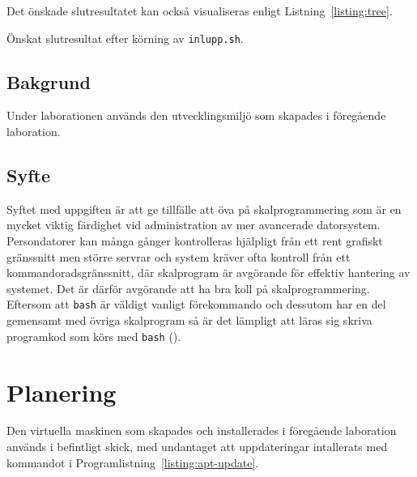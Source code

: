 Det önskade slutresultatet kan också visualiseras enligt Listning~\ref{listing:tree}.

\begin{listing}[H]
\caption{Önskat slutresultat efter körning av \texttt{inlupp.sh}.}
\label{listing:tree}
\end{listing}


\subsection{Bakgrund}
Under laborationen används den utvecklingsmiljö som skapades i föregående
laboration.


\subsection{Syfte}
Syftet med uppgiften är att ge tillfälle att öva på skalprogrammering som är en
mycket viktig färdighet vid administration av mer avancerade datorsystem.
Persondatorer kan många gånger kontrolleras hjälpligt från ett rent grafiskt
gränssnitt men större servrar och system kräver ofta kontroll från ett
kommandoradsgränssnitt, där skalprogram är avgörande för effektiv hantering av
systemet.  Det är därför avgörande att ha bra koll på skalprogrammering.
Eftersom att \texttt{bash} är väldigt vanligt förekommando och dessutom har en
del gemensamt med övriga skalprogram så är det lämpligt att läras sig skriva
programkod som körs med \texttt{bash} (\cite{forelasning02}).



\section{Planering}
Den virtuella maskinen som skapades och installerades i föregående laboration
används i befintligt skick, med undantaget att uppdateringar intallerats med
kommandot i Programlistning~\ref{listing:apt-update}.

